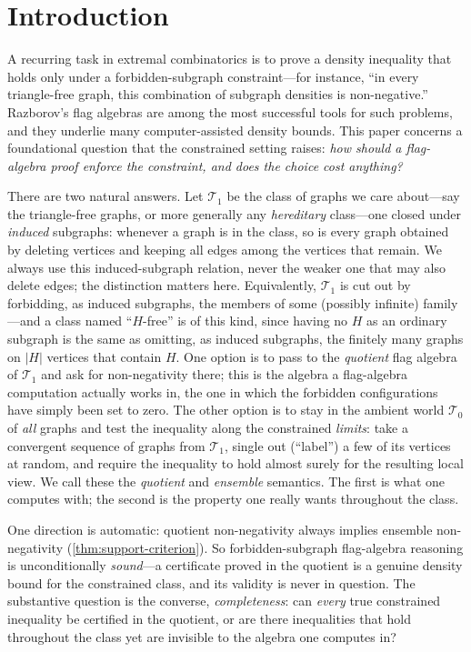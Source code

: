 \documentclass[11pt]{article}
\theoremstyle{definition}
\newcommand{\T}{\mathcal{T}}
\begin{document}
\section{Introduction}

A recurring task in extremal combinatorics is to prove a density inequality that holds
only under a forbidden-subgraph constraint---for instance, ``in every triangle-free graph,
this combination of subgraph densities is non-negative.''  Razborov's flag algebras
\cite{Razborov2007} are among the most successful tools for such problems, and they
underlie many computer-assisted density bounds.  This paper concerns a foundational question that the
constrained setting raises: \emph{how should a flag-algebra proof enforce the constraint,
and does the choice cost anything?}

There are two natural answers.  Let $\T_1$ be the class of graphs we care about---say the
triangle-free graphs, or more generally any \emph{hereditary} class---one closed under
\emph{induced} subgraphs: whenever a graph is in the class, so is every graph obtained by
deleting vertices and keeping all edges among the vertices that remain.  We always use this
induced-subgraph relation, never the weaker one that may also delete edges; the distinction
matters here.  Equivalently, $\T_1$ is cut out by forbidding, as induced subgraphs, the
members of some (possibly infinite) family---and a class named ``$H$-free'' is of this
kind, since having no $H$ as an ordinary subgraph is the same as omitting,
as induced subgraphs, the finitely many graphs on $|H|$ vertices that contain $H$.
One option is to pass to the \emph{quotient} flag algebra of $\T_1$ and ask for
non-negativity there; this is the algebra a flag-algebra computation actually works in,
the one in which the forbidden configurations have simply been set to zero.  The other
option is to stay in the ambient world $\T_0$ of \emph{all} graphs and test the inequality
along the constrained \emph{limits}: take a convergent sequence of graphs from $\T_1$,
single out (``label'') a few of its vertices at random, and require the inequality to hold
almost surely for the resulting local view.  We call these the \emph{quotient} and
\emph{ensemble} semantics.  The first is what one computes with; the second is the
property one really wants throughout the class.

One direction is automatic: quotient non-negativity always implies ensemble
non-negativity (\cref{thm:support-criterion}).  So forbidden-subgraph flag-algebra
reasoning is unconditionally \emph{sound}---a certificate proved in the quotient is a
genuine density bound for the constrained class, and its validity is never in question.
The substantive question is the converse, \emph{completeness}: can \emph{every} true
constrained inequality be certified in the quotient, or are there inequalities that hold
throughout the class yet are invisible to the algebra one computes in?
\end{document}
